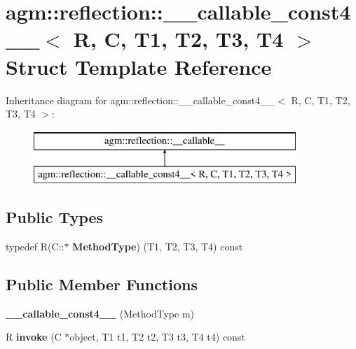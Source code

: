 \hypertarget{structagm_1_1reflection_1_1____callable__const4____}{}\section{agm\+:\+:reflection\+:\+:\+\_\+\+\_\+callable\+\_\+const4\+\_\+\+\_\+$<$ R, C, T1, T2, T3, T4 $>$ Struct Template Reference}
\label{structagm_1_1reflection_1_1____callable__const4____}
Inheritance diagram for agm\+:\+:reflection\+:\+:\+\_\+\+\_\+callable\+\_\+const4\+\_\+\+\_\+$<$ R, C, T1, T2, T3, T4 $>$\+:\begin{figure}[H]
\begin{center}
\leavevmode
\includegraphics[height=2.000000cm]{structagm_1_1reflection_1_1____callable__const4____}
\end{center}
\end{figure}
\subsection*{Public Types}
\begin{DoxyCompactItemize}
\item 
typedef R(C\+::$\ast$ {\bfseries Method\+Type}) (T1, T2, T3, T4) const \hypertarget{structagm_1_1reflection_1_1____callable__const4_____ae12c91952a5e02b042339e950465c498}{}\label{structagm_1_1reflection_1_1____callable__const4_____ae12c91952a5e02b042339e950465c498}

\end{DoxyCompactItemize}
\subsection*{Public Member Functions}
\begin{DoxyCompactItemize}
\item 
{\bfseries \+\_\+\+\_\+callable\+\_\+const4\+\_\+\+\_\+} (Method\+Type m)\hypertarget{structagm_1_1reflection_1_1____callable__const4_____a164faa338cf27f0084f3dcd95ee82e61}{}\label{structagm_1_1reflection_1_1____callable__const4_____a164faa338cf27f0084f3dcd95ee82e61}

\item 
R {\bfseries invoke} (C $\ast$object, T1 t1, T2 t2, T3 t3, T4 t4) const \hypertarget{structagm_1_1reflection_1_1____callable__const4_____a80254ddbc188b556a21efb8697cbbd2d}{}\label{structagm_1_1reflection_1_1____callable__const4_____a80254ddbc188b556a21efb8697cbbd2d}

\end{DoxyCompactItemize}
